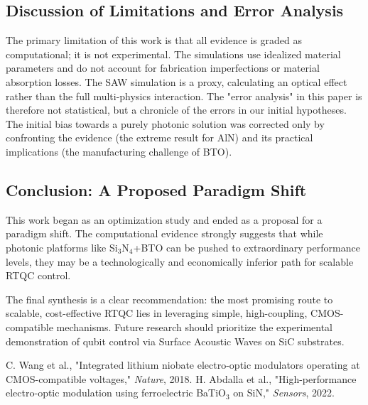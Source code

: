 \documentclass[conference]{IEEEtran} %
\begin{document}
\subsection{Discussion of Limitations and Error Analysis}
The primary limitation of this work is that all evidence is graded as computational; it is not experimental. The simulations use idealized material parameters and do not account for fabrication imperfections or material absorption losses. The SAW simulation is a proxy, calculating an optical effect rather than the full multi-physics interaction. The "error analysis" in this paper is therefore not statistical, but a chronicle of the errors in our initial hypotheses. The initial bias towards a purely photonic solution was corrected only by confronting the evidence (the extreme result for AlN) and its practical implications (the manufacturing challenge of BTO).

\subsection{Conclusion: A Proposed Paradigm Shift}
This work began as an optimization study and ended as a proposal for a paradigm shift. The computational evidence strongly suggests that while photonic platforms like Si$_3$N$_4$+BTO can be pushed to extraordinary performance levels, they may be a technologically and economically inferior path for scalable RTQC control.

The final synthesis is a clear recommendation: the most promising route to scalable, cost-effective RTQC lies in leveraging simple, high-coupling, CMOS-compatible mechanisms. Future research should prioritize the experimental demonstration of qubit control via Surface Acoustic Waves on SiC substrates.


\begin{thebibliography}{9}
C. Wang et al., "Integrated lithium niobate electro-optic modulators operating at CMOS-compatible voltages," \textit{Nature}, 2018.
H. Abdalla et al., "High-performance electro-optic modulation using ferroelectric BaTiO$_3$ on SiN," \textit{Sensors}, 2022.
\end{thebibliography}

\end{document}
